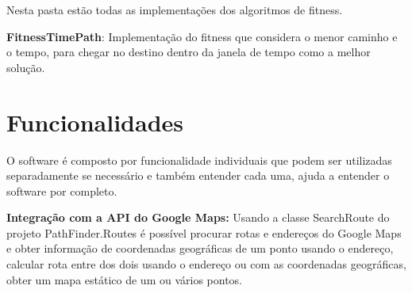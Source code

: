 Nesta pasta estão todas as implementações dos algoritmos de fitness.

\textbf{FitnessTimePath}: Implementação do fitness que considera o menor caminho e o tempo, para chegar no destino dentro da janela de tempo como a melhor solução.

\section{Funcionalidades}
O software é composto por funcionalidade individuais que podem ser utilizadas separadamente se necessário e também entender cada uma, ajuda a entender o software por completo.

\textbf{Integração com a API do Google Maps:} Usando a classe SearchRoute do projeto PathFinder.Routes é possível procurar rotas e endereços do Google Maps e obter informação de coordenadas geográficas de um ponto usando o endereço, calcular rota entre dos dois usando o endereço ou com as coordenadas geográficas, obter um mapa estático de um ou vários pontos.